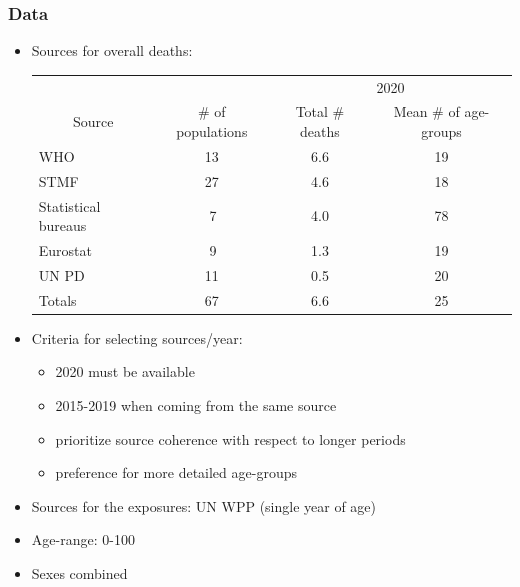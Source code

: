 \documentclass[table,xcdraw,dvipsnames]{beamer}
\begin{document}
\begin{frame}[fragile]\frametitle{Data}
	\vspace{-0.2cm}
\begin{itemize}
	\item Sources for overall deaths:
	\begin{scriptsize}
	\begin{table}[]
		\begin{tabular}{l|c|c|c}
			\multicolumn{1}{c|}{}                         &                                     & \multicolumn{2}{c}{2020}                                \\
			\multicolumn{1}{c|}{\multirow{-2}{*}{Source}} & \multirow{-2}{*}{\# of populations} & Total \# deaths             & Mean \# of age-groups      \\ \cline{3-4} 
			\rowcolor[HTML]{EFEFEF} 
			WHO                     & 13                                  & 6.6 & 19                         \\
			\rowcolor[HTML]{FFFFFF} 
			STMF                                          & 27                                  & 4.6                         & 18                         \\
			\rowcolor[HTML]{EFEFEF} 
			Statistical bureaus                           & \;\,7 & 4.0 &78 \\
			\rowcolor[HTML]{FFFFFF} 
			Eurostat                                      & \;\,9 & 1.3                         & 19                         \\
			\rowcolor[HTML]{EFEFEF} 
			UN PD                        & 11                                  & 0.5 & 20 \\ \hline
			\rowcolor[HTML]{FFFFFF} 
			Totals                                        & 67                                  & 6.6                         & 25                        
		\end{tabular}
	\end{table}
	
\end{scriptsize}
	\item Criteria for selecting sources/year:
	\begin{itemize}
		\item 2020 must be available
		\item 2015-2019 when coming from the same source
		\item prioritize source coherence with respect to longer periods
		\item preference for more detailed age-groups
	\end{itemize}
	\item Sources for the exposures: UN WPP (single year of age)
\item Age-range: 0-100
\item Sexes combined
\end{itemize}

	
\end{frame}
\end{document}
